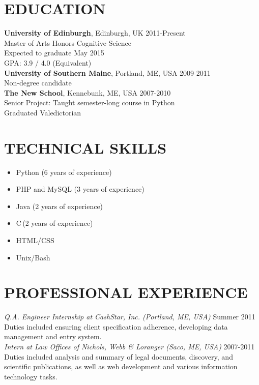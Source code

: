\documentclass[line, margin]{res}
\newcommand{\CS}{C\nolinebreak\hspace{-.05em}\raisebox{.6ex}{\scriptsize\bf \#}}
\begin{document}
\address{24 Lutton Place\\ Edinburgh, Scotland EH8 9PE | 001 44 7719 663016 | chase@chasestevens.com}

\begin{resume}
\section{EDUCATION}
\textbf{University of Edinburgh}, Edinburgh, UK \hfill 2011-Present\\
Master of Arts Honors Cognitive Science \\
Expected to graduate May 2015 \\
GPA: 3.9 / 4.0 (Equivalent) \\[5pt]
\textbf{University of Southern Maine}, Portland, ME, USA \hfill 2009-2011\\
Non-degree candidate\\[5pt]
\textbf{The New School}, Kennebunk, ME, USA \hfill 2007-2010\\
Senior Project: Taught semester-long course in Python \\
Graduated Valedictorian

\section{TECHNICAL SKILLS}
\begin{itemize}[leftmargin=10pt]
\item Python (6 years of experience)
\item PHP and MySQL (3 years of experience)
\item Java (2 years of experience)
\item \CS \,(2 years of experience)
\item HTML/CSS
\item Unix/Bash
\end{itemize}

\section{PROFESSIONAL EXPERIENCE}
\textit{Q.A. Engineer Internship at CashStar, Inc. (Portland, ME, USA)} \hfill Summer 2011 \\
Duties included ensuring client specification adherence, developing data management and entry system.\\[5pt]
\textit{Intern at Law Offices of Nichols, Webb \& Loranger (Saco, ME, USA)} \hfill 2007-2011 \\
Duties included analysis and summary of legal documents, discovery, and scientific publications, as well as web development and various information technology tasks. 


\end{resume}
\end{document}
